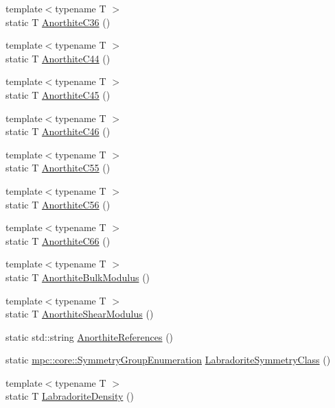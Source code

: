 \begin{DoxyCompactItemize}
{\footnotesize template$<$typename T $>$ }\\static T \mbox{\hyperlink{namespacempc_1_1data_a3bbc1c05c538dbbd7c0e1061820d9160}{Anorthite\+C36}} ()
\item 
{\footnotesize template$<$typename T $>$ }\\static T \mbox{\hyperlink{namespacempc_1_1data_a29c054f9ac1e39ce53342ba5f542c7a9}{Anorthite\+C44}} ()
\item 
{\footnotesize template$<$typename T $>$ }\\static T \mbox{\hyperlink{namespacempc_1_1data_af211583e8b156ee78c9dada8a36c229d}{Anorthite\+C45}} ()
\item 
{\footnotesize template$<$typename T $>$ }\\static T \mbox{\hyperlink{namespacempc_1_1data_ab7379a7da73a9e228896a6f48d690a9e}{Anorthite\+C46}} ()
\item 
{\footnotesize template$<$typename T $>$ }\\static T \mbox{\hyperlink{namespacempc_1_1data_ac1e80b87de32e633a36cc5e6891b00c9}{Anorthite\+C55}} ()
\item 
{\footnotesize template$<$typename T $>$ }\\static T \mbox{\hyperlink{namespacempc_1_1data_a6d52b257e6897b49d3e7f5dd2956702d}{Anorthite\+C56}} ()
\item 
{\footnotesize template$<$typename T $>$ }\\static T \mbox{\hyperlink{namespacempc_1_1data_a36f6458af0647d5c0f96b4ee29da7244}{Anorthite\+C66}} ()
\item 
{\footnotesize template$<$typename T $>$ }\\static T \mbox{\hyperlink{namespacempc_1_1data_ab8e79f203a9a0fb9e5035edb8434beb3}{Anorthite\+Bulk\+Modulus}} ()
\item 
{\footnotesize template$<$typename T $>$ }\\static T \mbox{\hyperlink{namespacempc_1_1data_a98b459e107a1b45c43b027961077dd65}{Anorthite\+Shear\+Modulus}} ()
\item 
static std\+::string \mbox{\hyperlink{namespacempc_1_1data_ad4c145d7a309c3ae5866f20cc6e9c81b}{Anorthite\+References}} ()
\item 
static \mbox{\hyperlink{namespacempc_1_1core_a9d979684062547055a0ef5c13077bad8}{mpc\+::core\+::\+Symmetry\+Group\+Enumeration}} \mbox{\hyperlink{namespacempc_1_1data_abff1c2d49cd8cedd4cd296fac8e54a7b}{Labradorite\+Symmetry\+Class}} ()
\item 
{\footnotesize template$<$typename T $>$ }\\static T \mbox{\hyperlink{namespacempc_1_1data_ad99c2afbd59be4eacaebeede81e18ad2}{Labradorite\+Density}} ()

\end{DoxyCompactItemize}
